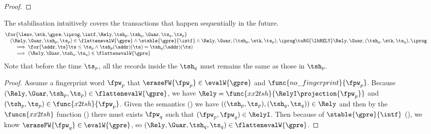 \begin{proof}
\end{proof}

\begin{lem}
\label{lem:stable-sound}

The stabilisation intuitively covers the transactions that happen sequentially in the future.
\[
\begin{array}{@{}l@{}}
    \for{\lenv, \stk, \gpre, \iprog, \intf, \Rely, \tsh_{p}, \tsh_{q}, \Guar, \ts_{q}, \ts_{p}}  \\
    \quad (\Rely, \Guar, \tsh_{p}, \ts_{p}) \in \flattenevalW{\gpre}
    \land \stable{\gpre}{\intf} 
    \land \Rely, \Guar, (\tsh_{p}, \stk, \ts_{p}), \iprog \toRG{\lbRELY} \Rely, \Guar, (\tsh_{q}, \stk, \ts_{q}), \iprog \\
    \qquad \implies \for{\addr, \ts}
    \ts \leq \ts_{p} \land \tsh_{p}(\addr)(\ts) = \tsh_{q}(\addr)(\ts) \\
    \qquad \implies  (\Rely, \Guar, \tsh_{q}, \ts_{q}) \in \flattenevalW{\gpre} 
\end{array}
\]
Note that before the time \( \ts_{p} \), all the records inside the \( \tsh_{q} \) must remains the same as those in \( \tsh_{p} \).
\end{lem}
\begin{proof}
Assume a fingerprint word \( \fpw_{p} \) that \( \eraseFW{\fpw_{p}} \in \evalW{\gpre} \) and \( \func{no\_fingerprint}{\fpw_{p}}\).
Because \( (\Rely, \Guar, \tsh_{p}, \ts_{p}) \in  \flattenevalW{\gpre} \), we have \( \Rely = \func{xx2tsh}{\RelyI\projection{\fpw_{p}}} \) and \( (\tsh_{p}, \ts_{p}) \in \func{x2tsh}{\fpw_{p}}\).
Given the semantics () we have \( ((\tsh_{p}, \ts_{p}),(\tsh_{q}, \ts_{q})) \in \Rely \) and then by the \( \funcn{xx2tsh} \) function () there must exists \( \fpw_{q}\) such that \( ( \fpw_{p}, \fpw_{q} ) \in \RelyI \).
Then because of \( \stable{\gpre}{\intf} \) (), we know \( \eraseFW{\fpw_{q}} \in \evalW{\gpre}\), so \( (\Rely, \Guar, \tsh_{q}, \ts_{q}) \in \flattenevalW{\gpre} \).
\end{proof}


